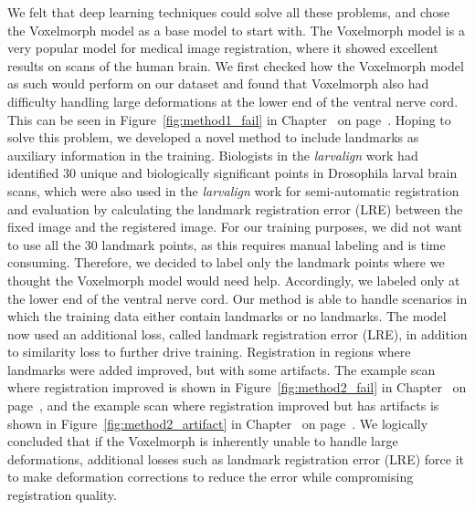 \documentclass{book}
\begin{document}
	
	We felt that deep learning techniques could solve all these problems, and chose the Voxelmorph \cite{Balakrishnan_2019} model as a base model to start with. The Voxelmorph model is a very popular model for medical image registration, where it showed excellent results on scans of the human brain. We first checked how the Voxelmorph model as such would perform on our dataset and found that Voxelmorph also had difficulty handling large deformations at the lower end of the ventral nerve cord. This can be seen in Figure~\ref{fig:method1_fail} in Chapter~ on page~\pageref{fig:method1_fail}. Hoping to solve this problem, we developed a novel method to include landmarks as auxiliary information in the training. Biologists in the \textit{larvalign} work had identified 30 unique and biologically significant points in Drosophila larval brain scans, which were also used in the \textit{larvalign} work for semi-automatic registration and evaluation by calculating the landmark registration error (LRE) between the fixed image and the registered image. For our training purposes, we did not want to use all the 30 landmark points, as this requires manual labeling and is time consuming. Therefore, we decided to label only the landmark points where we thought the Voxelmorph model would need help. Accordingly, we labeled only at the lower end of the ventral nerve cord. Our method is able to handle scenarios in which the training data either contain landmarks or no landmarks. The model now used an additional loss, called landmark registration error (LRE), in addition to similarity loss to further drive training. Registration in regions where landmarks were added improved, but with some artifacts. The example scan where registration improved is shown in Figure~\ref{fig:method2_fail} in Chapter~ on page~\pageref{fig:method2_fail}, and the example scan where registration improved but has artifacts is shown in Figure~\ref{fig:method2_artifact} in Chapter~ on page~\pageref{fig:method2_artifact}. We logically concluded that if the Voxelmorph is inherently unable to handle large deformations, additional losses such as landmark registration error (LRE) force it to make deformation corrections to reduce the error while compromising registration quality.
	
\end{document}
